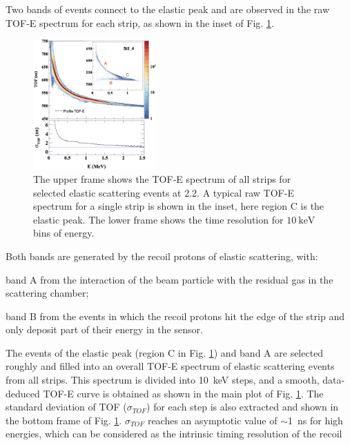 \documentclass[number,5p]{elsarticle}
\begin{document}
Two bands of events connect to the elastic peak and are observed in the raw TOF-E spectrum for each strip, as shown in the inset of Fig. \ref{fig:tof-e}.
\begin{figure}[h!]
  \centering
  \includegraphics[width=0.42\textwidth]{./tofe_tsigma.png}
  \caption{
    The upper frame shows the TOF-E spectrum of all strips for selected elastic
    scattering events at \SI{2.2}{\momentum}.
    A typical raw TOF-E spectrum for a single strip is shown in the inset, here region C is the elastic peak.
    The lower frame shows the time resolution for $\SI{10}{\keV}$ bins of energy.
  }
  \label{fig:tof-e}
\end{figure}
Both bands are generated by the recoil protons of elastic scattering, with:
\begin{enumerate*}[label=(\roman*)]
\item band A from the interaction of the beam particle with the residual gas in the scattering chamber;
\item band B from the events in which the recoil protons hit the edge of the strip and only deposit part of their energy in the sensor.
\end{enumerate*}
The events of the elastic peak (region C in Fig. \ref{fig:tof-e}) and band A are selected roughly and filled into an overall TOF-E spectrum of elastic scattering events from all strips.
This spectrum is divided into \SI{10}{\keV} steps,  and a smooth, data-deduced TOF-E curve is obtained as shown in the main plot of Fig. \ref{fig:tof-e}.
The standard deviation of TOF ($\sigma_{TOF}$) for each step is also extracted and shown in the bottom frame of Fig. \ref{fig:tof-e}.
$\sigma_{TOF}$ reaches an asymptotic value of $\sim$\SI{1}{\ns} for high energies, which can be considered as the intrinsic timing resolution of the recoil
\end{document}
